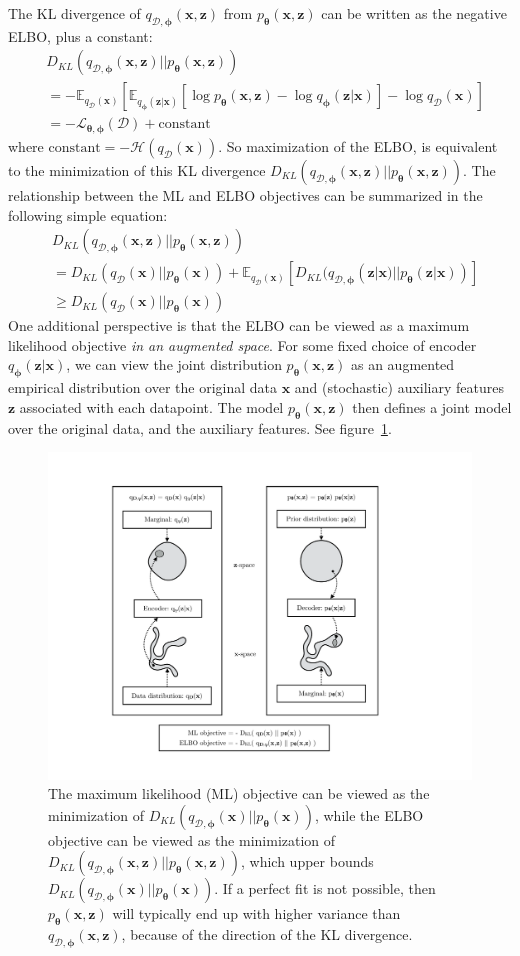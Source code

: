 \documentclass[MAL,biber]{nowfnt} %
\newcommand{\bb}[1]{\mathbf{#1}}
\newcommand{\bx}{\bb{x}}
\newcommand{\bz}{\bb{z}}
\newcommand{\bT}{\boldsymbol{\theta}}
\newcommand{\bphi}{\boldsymbol{\phi}}
\newcommand{\pT}{p_{\bT}}
\newcommand{\qP}{q_{\bphi}}
\newcommand{\qD}{q_\mathcal{D}}
\newcommand{\qDP}{q_{\mathcal{D},\bphi}}
\newcommand{\Exp}[2]{\mathbb{E}_{#1}\left[#2\right]}
\newcommand{\ELBO}{\mathcal{L}_{\bT,\bphi}}
\begin{document}
The KL divergence of $\qDP(\bx,\bz)$ from $\pT(\bx,\bz)$ can be written as the negative ELBO, plus a constant:
\begin{align}
&D_{KL}(\qDP(\bx,\bz) || \pT(\bx,\bz))\\
&= - \Exp{\qD(\bx)}{\Exp{\qP(\bz|\bx)}{\log \pT(\bx,\bz) - \log \qP(\bz|\bx)} - \log \qD(\bx)}\\
&= - \ELBO(\mathcal{D}) + \text{constant}
\label{eq:elbokl2}
\end{align}
where $\text{constant} = - \mathcal{H}(\qD(\bx))$. So maximization of the ELBO, is equivalent to the minimization of this KL divergence $D_{KL}(\qDP(\bx,\bz) || \pT(\bx,\bz))$.
The relationship between the ML and ELBO objectives can be summarized in the following simple equation:
\begin{align}
&D_{KL}(\qDP(\bx,\bz) || \pT(\bx,\bz))\\
&= D_{KL}(\qD(\bx) || \pT(\bx)) + \Exp{\qD(\bx)}{D_{KL}(\qDP(\bz|\bx) || \pT(\bz|\bx))}\\
&\geq D_{KL}(\qD(\bx) || \pT(\bx))
\end{align}
One additional perspective is that the ELBO can be viewed as a maximum likelihood objective \emph{in an augmented space}. For some fixed choice of encoder $\qP(\bz|\bx)$, we can view the joint distribution $\pT(\bx,\bz)$ as an augmented empirical distribution over the original data $\bx$ and (stochastic) auxiliary features $\bz$ associated with each datapoint. The model $\pT(\bx,\bz)$ then defines a joint model over the original data, and the auxiliary features. See figure~\ref{fig:klqxzpxz}.

\begin{figure}
	\centering
	\includegraphics[width=0.9\linewidth]{figures/klqxzpxz}
	\caption{The maximum likelihood (ML) objective can be viewed as the minimization of $D_{KL}(\qDP(\bx) || \pT(\bx))$, while the ELBO objective can be viewed as the minimization of $D_{KL}(\qDP(\bx,\bz) || \pT(\bx,\bz))$, which upper bounds $D_{KL}(\qDP(\bx) || \pT(\bx))$. If a perfect fit is not possible, then $\pT(\bx,\bz)$ will typically end up with higher variance than $\qDP(\bx,\bz)$, because of the direction of the KL divergence.}
	\label{fig:klqxzpxz}
\end{figure}
\end{document}
